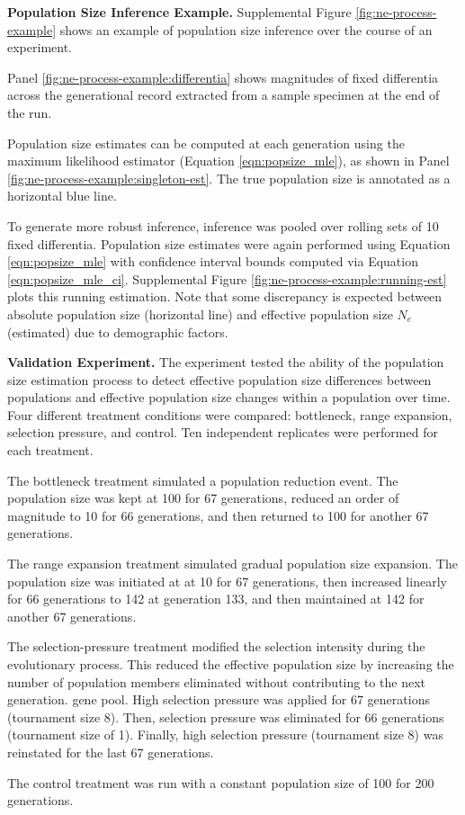 \textbf{Population Size Inference Example.}
Supplemental Figure \ref{fig:ne-process-example} shows an example of population size inference over the course of an experiment.

Panel \ref{fig:ne-process-example:differentia} shows magnitudes of fixed differentia across the generational record extracted from a sample specimen at the end of the run.

Population size estimates can be computed at each generation using the maximum likelihood estimator (Equation \ref{eqn:popsize_mle}), as shown in Panel \ref{fig:ne-process-example:singleton-est}.
The true population size is annotated as a horizontal blue line.

To generate more robust inference, inference was pooled over rolling sets of 10 fixed differentia.
Population size estimates were again performed using Equation \ref{eqn:popsize_mle} with confidence interval bounds computed via Equation \ref{eqn:popsize_mle_ci}.
Supplemental Figure \ref{fig:ne-process-example:running-est} plots this running estimation.
Note that some discrepancy is expected between absolute population size (horizontal line) and effective population size $N_e$ (estimated) due to demographic factors.

\textbf{Validation Experiment.}
The experiment tested the ability of the population size estimation process to detect effective population size differences between populations and effective population size changes within a population over time.
Four different treatment conditions were compared: bottleneck, range expansion, selection pressure, and control.
Ten independent replicates were performed for each treatment.

The bottleneck treatment simulated a population reduction event.
The population size was kept at 100 for 67 generations, reduced an order of magnitude to 10 for 66 generations, and then returned to 100 for another 67 generations.

The range expansion treatment simulated gradual population size expansion.
The population size was initiated at at 10 for 67 generations, then increased linearly for 66 generations to 142 at generation 133, and then maintained at 142 for another 67 generations.

The selection-pressure treatment modified the selection intensity during the evolutionary process.
This reduced the effective population size by increasing the number of population members eliminated without contributing to the next generation. gene pool.
High selection pressure was applied for 67 generations (tournament size 8). Then, selection pressure was eliminated for 66 generations (tournament size of 1).
Finally, high selection pressure (tournament size 8) was reinstated for the last 67 generations.

The control treatment was run with a constant population size of 100 for 200 generations.
